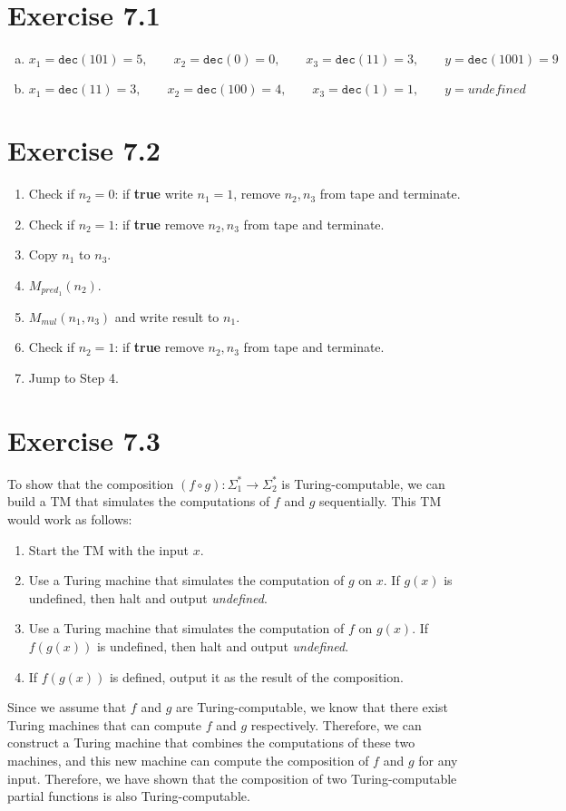 \documentclass{article} %
\newcommand{\homeworkNumber}{7}
\begin{document}
\section*{Exercise \homeworkNumber.1}
\begin{enumerate}[(a)]
\item
$$
x_1 = \texttt{dec}(101) = 5,\qquad x_2 = \texttt{dec}(0) = 0,\qquad x_3 = \texttt{dec}(11) = 3,\qquad y = \texttt{dec}(1001) = 9
$$
\item
$$
x_1 = \texttt{dec}(11) = 3,\qquad x_2 = \texttt{dec}(100) = 4,\qquad x_3 = \texttt{dec}(1) = 1,\qquad y = \textit{undefined}
$$
\end{enumerate}

\section*{Exercise \homeworkNumber.2}
\begin{enumerate}[Step 1.]
\item
Check if $n_2 = 0$: if \textbf{true} write $n_1 = 1$, remove $n_2, n_3$ from tape and terminate.
\item
Check if $n_2 = 1$: if \textbf{true} remove $n_2, n_3$ from tape and terminate.
\item
Copy $n_1$ to $n_3$.
\item
$M_{pred_1}(n_2)$.
\item
$M_{mul}(n_1, n_3)$ and write result to $n_1$.
\item
Check if $n_2 = 1$: if \textbf{true} remove $n_2, n_3$ from tape and terminate.
\item
Jump to Step 4.

\end{enumerate}

\section*{Exercise \homeworkNumber.3}
To show that the composition $(f \circ g) : \Sigma_1^* \to \Sigma_2^*$ is Turing-computable, we can build a TM that simulates the computations of $f$ and $g$ sequentially. This TM would work as follows:
\begin{enumerate}
\item
Start the TM with the input $x$.
\item
Use a Turing machine that simulates the computation of $g$ on $x$. If $g(x)$ is undefined, then halt and output \textit{undefined}.
\item
Use a Turing machine that simulates the computation of $f$ on $g(x)$. If $f(g(x))$ is undefined, then halt and output \textit{undefined}.
\item
If $f(g(x))$ is defined, output it as the result of the composition.
\end{enumerate}
Since we assume that $f$ and $g$ are Turing-computable, we know that there exist Turing machines that can compute $f$ and $g$ respectively. Therefore, we can construct a Turing machine that combines the computations of these two machines, and this new machine can compute the composition of $f$ and $g$ for any input. Therefore, we have shown that the composition of two Turing-computable partial functions is also Turing-computable.
\end{document}
